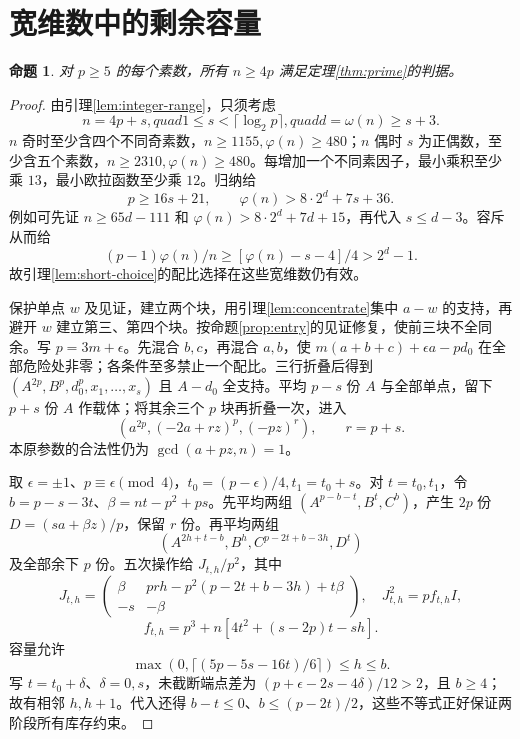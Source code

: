 \documentclass[11pt,a4paper]{article}
\newtheorem{proposition}[theorem]{命题}
\theoremstyle{definition}
\numberwithin{equation}{section}
\begin{document}
\section{宽维数中的剩余容量}
\begin{proposition}\label{prop:wide}
对 $p\ge5$ 的每个素数，所有 $n\ge4p$ 满足定理\ref{thm:prime}的判据。
\end{proposition}
\begin{proof}
由引理\ref{lem:integer-range}，只须考虑
\begin{equation}
n=4p+s,quad1\le s<\lceil\log_2p\rceil,quad d=\omega(n)\ge s+3.
\end{equation}
$n$ 奇时至少含四个不同奇素数，$n\ge1155,\varphi(n)\ge480$；$n$ 偶时 $s$ 为正偶数，至少含五个素数，$n\ge2310,\varphi(n)\ge480$。每增加一个不同素因子，最小乘积至少乘 $13$，最小欧拉函数至少乘 $12$。归纳给
\begin{equation}\label{eq:tail-estimates}
p\ge16s+21,\qquad \varphi(n)>8\cdot2^d+7s+36.
\end{equation}
例如可先证 $n\ge65d-111$ 和 $\varphi(n)>8\cdot2^d+7d+15$，再代入 $s\le d-3$。容斥从而给
\[(p-1)\varphi(n)/n\ge[\varphi(n)-s-4]/4>2^d-1.
\]
故引理\ref{lem:short-choice}的配比选择在这些宽维数仍有效。

保护单点 $w$ 及见证，建立两个块，用引理\ref{lem:concentrate}集中 $a-w$ 的支持，再避开 $w$ 建立第三、第四个块。按命题\ref{prop:entry}的见证修复，使前三块不全同余。写 $p=3m+\epsilon$。先混合 $b,c$，再混合 $a,b$，使 $m(a+b+c)+\epsilon a-pd_0$ 在全部危险处非零；各条件至多禁止一个配比。三行折叠后得到 $(A^{2p},B^p,d_0^p,x_1,\ldots,x_s)$ 且 $A-d_0$ 全支持。平均 $p-s$ 份 $A$ 与全部单点，留下 $p+s$ 份 $A$ 作载体；将其余三个 $p$ 块再折叠一次，进入
\begin{equation}
(a^{2p},(-2a+rz)^p,(-pz)^r),\qquad r=p+s.
\end{equation}
本原参数的合法性仍为 $\gcd(a+pz,n)=1$。

取 $\epsilon=\pm1$、$p\equiv\epsilon\pmod4$，$t_0=(p-\epsilon)/4,t_1=t_0+s$。对 $t=t_0,t_1$，令 $b=p-s-3t$、$\beta=nt-p^2+ps$。先平均两组 $(A^{p-b-t},B^t,C^b)$，产生 $2p$ 份 $D=(sa+\beta z)/p$，保留 $r$ 份。再平均两组
\[
(A^{2h+t-b},B^h,C^{p-2t+b-3h},D^t)
\]
及全部余下 $p$ 份。五次操作给 $J_{t,h}/p^2$，其中
\begin{equation}
J_{t,h}=\begin{pmatrix}\beta&prh-p^2(p-2t+b-3h)+t\beta\\-s&-\beta\end{pmatrix},
\quad J_{t,h}^2=pf_{t,h}I,
\end{equation}
\[
f_{t,h}=p^3+n[4t^2+(s-2p)t-sh].
\]
容量允许
\[
\max(0,\lceil(5p-5s-16t)/6\rceil)\le h\le b.
\]
写 $t=t_0+\delta$、$\delta=0,s$，未截断端点差为 $(p+\epsilon-2s-4\delta)/12>2$，且 $b\ge4$；故有相邻 $h,h+1$。代入还得 $b-t\le0$、$b\le(p-2t)/2$，这些不等式正好保证两阶段所有库存约束。


\end{proof}
\end{document}
